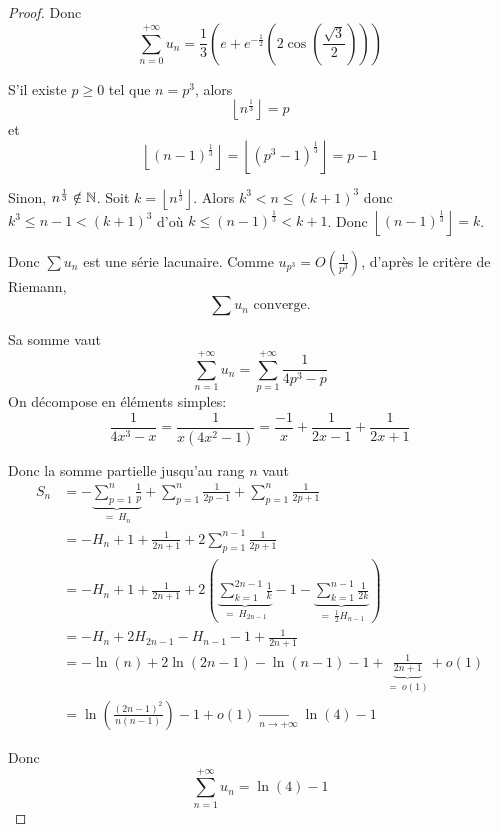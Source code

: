 \begin{proof}
	Donc 
	$$\boxed{\sum_{n=0}^{+\infty} u_{n}=\frac{1}{3}\left(e+e^{-\frac{1}{2}}\left(2\cos\left(\frac{\sqrt{3}}{2}\right)\right)\right)}$$

	\item S'il existe $p\geqslant0$ tel que $n=p^{3}$, alors 
	$$\left\lfloor n^{\frac{1}{3}}\right\rfloor=p$$
	et 
	$$\left\lfloor \left(n-1\right)^{\frac{1}{3}}\right\rfloor=\left\lfloor \left(p^{3}-1\right)^{\frac{1}{3}}\right\rfloor=p-1$$

	Sinon, $n^{\frac{1}{3}}\notin\mathbb{N}$. Soit $k=\left\lfloor n^{\frac{1}{3}}\right\rfloor$. Alors $k^{3}<n\leqslant (k+1)^{3}$ donc $k^{3}\leqslant n-1<(k+1)^{3}$ d'où $k\leqslant (n-1)^{\frac{1}{3}}<k+1$. Donc $\left\lfloor(n-1)^{\frac{1}{3}}\right\rfloor=k$.

	Donc $\sum u_{n}$ est une série lacunaire. Comme $u_{p^{3}}=O\left(\frac{1}{p^{3}}\right)$, d'après le critère de Riemann,
	$$\boxed{\sum u_{n}\text{ converge.}}$$

	Sa somme vaut 
	$$\sum_{n=1}^{+\infty}u_{n}=\sum_{p=1}^{+\infty}\frac{1}{4p^{3}-p}$$
	On décompose en éléments simples:
	$$\frac{1}{4x^{3}-x}=\frac{1}{x(4x^{2}-1)}=\frac{-1}{x}+\frac{1}{2x-1}+\frac{1}{2x+1}$$

	Donc la somme partielle jusqu'au rang $n$ vaut
	\begin{align*}
		S_{n}
		&=-\underbrace{\sum_{p=1}^{n}\frac{1}{p}}_{=~H_{n}}+\sum_{p=1}^{n}\frac{1}{2p-1}+\sum_{p=1}^{n}\frac{1}{2p+1}\\
		&=-H_{n}+1+\frac{1}{2n+1}+2\sum_{p=1}^{n-1}\frac{1}{2p+1}\\
		&=-H_{n}+1+\frac{1}{2n+1}+2\left(\underbrace{\sum_{k=1}^{2n-1}\frac{1}{k}}_{=~H_{2n-1}}-1-\underbrace{\sum_{k=1}^{n-1}\frac{1}{2k}}_{=~\frac{1}{2}H_{n-1}}\right)\\
		&=-H_{n}+2H_{2n-1}-H_{n-1}-1+\frac{1}{2n+1}\\
		&=-\ln(n)+2\ln(2n-1)-\ln(n-1)-1+\underbrace{\frac{1}{2n+1}}_{=~o\left(1\right)}+o\left(1\right)\\
		&=\ln\left(\frac{(2n-1)^{2}}{n(n-1)}\right)-1+o\left(1\right)\xrightarrow[n\to+\infty]{}\ln(4)-1
	\end{align*}

	Donc 
	$$\boxed{\sum_{n=1}^{+\infty}u_{n}=\ln(4)-1}$$
\end{proof}

